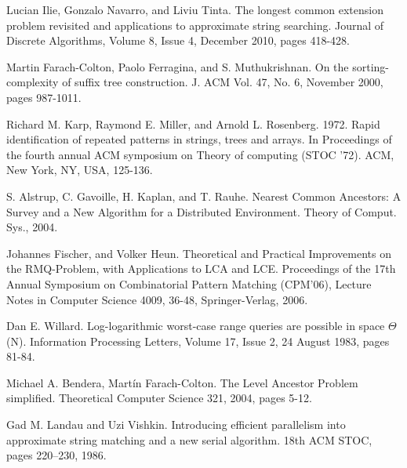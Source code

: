 \documentclass[a4]{article}
\begin{document}
\begin{thebibliography}{9}

 Lucian Ilie, Gonzalo Navarro, and Liviu Tinta. The longest common extension problem revisited and applications to approximate string searching. Journal of Discrete Algorithms, Volume 8, Issue 4, December 2010, pages 418-428.


 Martin Farach-Colton, Paolo Ferragina, and S. Muthukrishnan. On the sorting-complexity of suffix tree construction. J. ACM Vol. 47, No. 6, November 2000, pages 987-1011.

 Richard M. Karp, Raymond E. Miller, and Arnold L. Rosenberg. 1972. Rapid identification of repeated patterns in strings, trees and arrays. In Proceedings of the fourth annual ACM symposium on Theory of computing (STOC '72). ACM, New York, NY, USA, 125-136.

 S. Alstrup, C. Gavoille, H. Kaplan, and T. Rauhe. Nearest Common Ancestors: A Survey and a New Algorithm for a Distributed Environment. Theory of Comput. Sys., 2004.

 Johannes Fischer, and Volker Heun. Theoretical and Practical Improvements on the RMQ-Problem, with Applications to LCA and LCE. Proceedings of the 17th Annual Symposium on Combinatorial Pattern Matching (CPM'06), Lecture Notes in Computer Science 4009, 36-48, Springer-Verlag, 2006.

 Dan E. Willard. Log-logarithmic worst-case range queries are possible in space $\Theta$(N). Information Processing Letters, Volume 17, Issue 2, 24 August 1983, pages 81-84.

 Michael A. Bendera, Martín Farach-Colton. The Level Ancestor Problem simplified. Theoretical Computer Science 321, 2004, pages 5-12.

 Gad M. Landau and Uzi Vishkin. Introducing efficient parallelism into approximate string matching and a new serial algorithm. 18th ACM STOC, pages 220–230, 1986.

\end{thebibliography}

\ifreport
\end{document}
